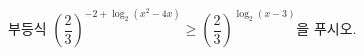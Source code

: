부등식 $\left(\dfrac{2}{3}\right)^{-2+\log_2 (x^2-4x)}\ge\left(\dfrac{2}{3}\right)^{\log_2 (x-3)}$을 푸시오.
